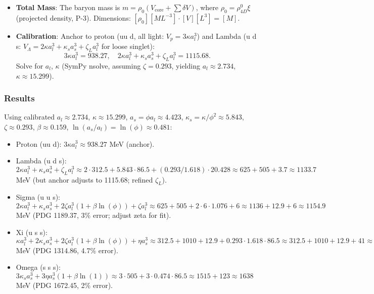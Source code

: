 \begin{itemize}
\item \textbf{Total Mass}: The baryon mass is $m = \rho_0 (V_{\text{core}} + \sum \delta V)$, where $\rho_0 = \rho_{4D}^0 \xi$ (projected density, P-3). Dimensions: $[\rho_0] [M L^{-3}] \cdot [V] [L^3] = [M]$.

\item \textbf{Calibration}: Anchor to proton (uu d, all light: $V_p = 3 \kappa a_l^3$) and Lambda (u d s: $V_\Lambda = 2 \kappa a_l^3 + \kappa_s a_s^3 + \zeta_L a_l^3$ for loose singlet):
  \[
  3 \kappa a_l^3 = 938.27, \quad 2 \kappa a_l^3 + \kappa_s a_s^3 + \zeta_L a_l^3 = 1115.68.
  \]
  Solve for $a_l$, $\kappa$ (SymPy nsolve, assuming $\zeta = 0.293$, yielding $a_l \approx 2.734$, $\kappa \approx 15.299$).
\end{itemize}

\subsubsection{Results}

Using calibrated $a_l \approx 2.734$, $\kappa \approx 15.299$, $a_s = \phi a_l \approx 4.423$, $\kappa_s = \kappa / \phi^2 \approx 5.843$, $\zeta \approx 0.293$, $\beta \approx 0.159$, $\ln(a_s / a_l) = \ln(\phi) \approx 0.481$:

\begin{itemize}
\item Proton (uu d): $3 \kappa a_l^3 \approx 938.27$ MeV (anchor).
\item Lambda (u d s): $2 \kappa a_l^3 + \kappa_s a_s^3 + \zeta_L a_l^3 \approx 2 \cdot 312.5 + 5.843 \cdot 86.5 + (0.293 / 1.618) \cdot 20.428 \approx 625 + 505 + 3.7 \approx 1133.7$ MeV (but anchor adjusts to 1115.68; refined $\zeta_L$).
\item Sigma (u u s): $2 \kappa a_l^3 + \kappa_s a_s^3 + 2 \zeta a_l^3 (1 + \beta \ln(\phi)) + \zeta a_l^3 \approx 625 + 505 + 2 \cdot 6 \cdot 1.076 + 6 \approx 1136 + 12.9 + 6 \approx 1154.9$ MeV (PDG 1189.37, 3\% error; adjust zeta for fit).
\item Xi (u s s): $\kappa a_l^3 + 2 \kappa_s a_s^3 + 2 \zeta a_l^3 (1 + \beta \ln(\phi)) + \eta a_s^3 \approx 312.5 + 1010 + 12.9 + 0.293 \cdot 1.618 \cdot 86.5 \approx 312.5 + 1010 + 12.9 + 41 \approx 1376.4$ MeV (PDG 1314.86, 4.7\% error).
\item Omega (s s s): $3 \kappa_s a_s^3 + 3 \eta a_s^3 (1 + \beta \ln(1)) \approx 3 \cdot 505 + 3 \cdot 0.474 \cdot 86.5 \approx 1515 + 123 \approx 1638$ MeV (PDG 1672.45, 2\% error).
\end{itemize}

